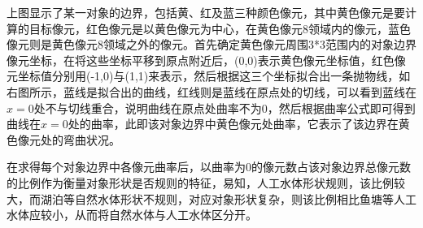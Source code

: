\documentclass[supercite]{upcthesis}
\begin{document}
\begin{itemize}
上图显示了某一对象的边界，包括黄、红及蓝三种颜色像元，其中黄色像元是要计算的目标像元，红色像元是以黄色像元为中心，在黄色像元8领域内的像元，蓝色像元则是黄色像元8领域之外的像元。首先确定黄色像元周围3*3范围内的对象边界像元坐标，在将这些坐标平移到原点附近后，(0,0)表示黄色像元坐标值，红色像元坐标值分别用(-1,0)与(1,1)来表示，然后根据这三个坐标拟合出一条抛物线，如右图所示，蓝线是拟合出的曲线，红线则是蓝线在原点处的切线，可以看到蓝线在$x=0$处不与切线重合，说明曲线在原点处曲率不为0，然后根据曲率公式即可得到曲线在$x=0$处的曲率，此即该对象边界中黄色像元处曲率，它表示了该边界在黄色像元处的弯曲状况。

在求得每个对象边界中各像元曲率后，以曲率为0的像元数占该对象边界总像元数的比例作为衡量对象形状是否规则的特征，易知，人工水体形状规则，该比例较大，而湖泊等自然水体形状不规则，对应对象形状复杂，则该比例相比鱼塘等人工水体应较小，从而将自然水体与人工水体区分开。
\end{itemize}
\end{document}
